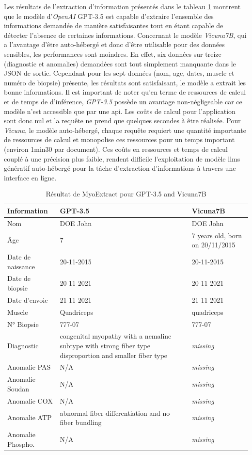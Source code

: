 Les  résultats de l'extraction d'information présentés dans le tableau \ref{tab:json_data} montrent que le modèle d'\textit{OpenAI} GPT-3.5 est capable d'extraire l'ensemble des informations demandée de manière satisfaisantes tout en étant capable de détecter l'absence de certaines informations. Concernant le modèle \textit{Vicuna7B}, qui a l'avantage d'être auto-hébergé et donc d'être utilisable pour des données sensibles, les performances sont moindres. En effet, six données sur treize (diagnostic et anomalies) demandées sont tout simplement manquante dans le JSON de sortie. Cependant pour les sept données (nom, age, dates, muscle et numéro de biopsie) présente, les résultats sont satisfaisant, le modèle a extrait les bonne informations.
Il est important de noter qu'en terme de ressources de calcul et de temps de d'inférence, \textit{GPT-3.5} possède un avantage non-négligeable car ce modèle n'est accessible que par une \gls{api}. Les coûts de calcul pour l'application sont donc nul et la requête ne prend que quelques secondes à être réalisée. Pour \textit{Vicuna}, le modèle auto-hébergé, chaque requête requiert une quantité importante de ressources de calcul et monopolise ces ressources pour un temps important (environ 1min30 par document). Ces coûts en ressources et temps de calcul couplé à une précision plus faible, rendent difficile l'exploitation de modèle \gls{llms} génératif auto-hébergé pour la tâche d'extraction d'informations à travers une interface en ligne.
\begin{table}[ht]
\centering
\caption{Résultat de MyoExtract pour GPT-3.5 and Vicuna7B}
\label{tab:json_data}
\begin{tabularx}{\textwidth}{|X|X|X|}
\hline
\textbf{Information} & \textbf{GPT-3.5} & \textbf{Vicuna7B} \\ \hline
Nom & DOE John & DOE John \\ \hline
Âge & 7 & 7 years old, born on 20/11/2015 \\ \hline
Date de naissance & 20-11-2015 & 20-11-2015 \\ \hline
Date de biopsie & 20-11-2021 & 20-11-2021 \\ \hline
Date d'envoie & 21-11-2021 & 21-11-2021 \\ \hline
Muscle & Quadriceps & quadriceps \\ \hline
N° Biopsie & 777-07 & 777-07 \\ \hline
Diagnostic & congenital myopathy with a nemaline subtype with strong fiber type disproportion and smaller fiber type & \textit{missing} \\ \hline
Anomalie PAS & N/A & \textit{missing} \\ \hline
Anomalie Soudan & N/A & \textit{missing} \\ \hline
Anomalie COX & N/A & \textit{missing} \\ \hline
Anomalie ATP & abnormal fiber differentiation and no fiber bundling & \textit{missing} \\ \hline
Anomalie Phospho. & N/A & \textit{missing} \\ \hline
\end{tabularx}
\end{table}

